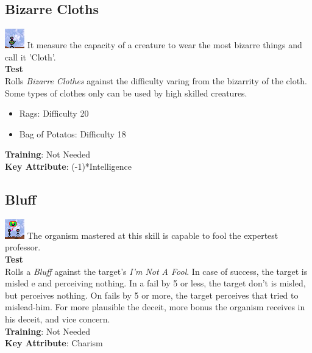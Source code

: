 \documentclass[ letterpaper,12pt]{article}
\begin{document}
\subsection{Bizarre Cloths}
\includegraphics{../data/skills/Img/roupasbizarras.png}
It measure the capacity of a creature to wear the most bizarre things and call it 'Cloth'.\\
{\bf Test}\\
Rolls {\it Bizarre Clothes} against the difficulty varing from the bizarrity of the cloth. Some types of clothes only can be used by high skilled creatures.\\
\begin{itemize}
\item{Rags: Difficulty 20}
\item{Bag of Potatos: Difficulty 18}
\end{itemize}
{\bf Training}: Not Needed\\
{\bf Key Attribute}: (-1)*Intelligence\\

\subsection{Bluff} 
\includegraphics{../data/skills/Img/blefar.png}
The organism mastered at this skill is capable to fool the expertest professor.\\
{\bf Test}\\
Rolls a {\it Bluff} against the target's {\it I'm Not A Fool}. In case of success, the target is misled e and perceiving nothing. In a fail by 5 or less, the target don't is misled, but perceives nothing. On fails by 5 or more, the target perceives that tried to mislead-him. For more plausible the deceit, more bonus the organism receives in his deceit, and vice concern.\\
{\bf Training}: Not Needed\\
{\bf Key Attribute}: Charism
\end{document}

